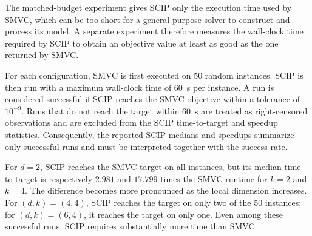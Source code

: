 \documentclass[%
 reprint,
 amsmath,amssymb,
 aps,
 pra,showkeys,
]{revtex4-2}
\begin{document}
The matched-budget experiment gives SCIP only the execution time used
by SMVC, which can be too short for a general-purpose solver to
construct and process its model. A separate experiment therefore
measures the wall-clock time required by SCIP to obtain an objective
value at least as good as the one returned by SMVC.

For each configuration, SMVC is first executed on 50 random instances.
SCIP is then run with a maximum wall-clock time of 60~s per instance.
A run is considered successful if SCIP reaches the SMVC objective
within a tolerance of $10^{-9}$. Runs that do not reach the target
within 60~s are treated as right-censored observations and are excluded
from the SCIP time-to-target and speedup statistics. Consequently, the
reported SCIP medians and speedups summarize only successful runs and
must be interpreted together with the success rate.

\begin{table}[t]
    \centering
    \caption{
    Wall-clock time required by SCIP to reach the SMVC objective value.
    The SMVC time is the median over all 50 instances. SCIP time and
    speedup are medians over successful runs only; unsuccessful runs are
    right-censored at 60~s. A speedup above one means that SCIP required
    more time than SMVC.
    }
    \label{tab:matrix_scip_comparison}
\end{table}

For $d=2$, SCIP reaches the SMVC target on all instances, but its median
time to target is respectively $2.981$ and $17.799$ times the SMVC
runtime for $k=2$ and $k=4$. The difference becomes more pronounced as
the local dimension increases. For $(d,k)=(4,4)$, SCIP reaches the
target on only two of the 50 instances; for $(d,k)=(6,4)$, it reaches
the target on only one. Even among these successful runs, SCIP requires
substantially more time than SMVC.
\end{document}
